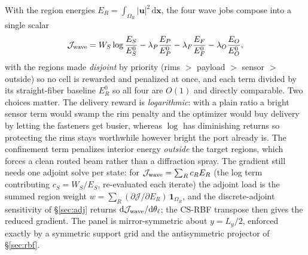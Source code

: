 With the region energies $E_R=\int_{\Omega_R}|\mathbf u|^2\,\mathrm d\mathbf x$, the four
wave jobs compose into a single scalar
\begin{equation}
  \mathcal J_{\rm wave}=W_S\log\frac{E_S}{E_S^0}
  -\lambda_P\frac{E_P}{E_P^0}-\lambda_F\frac{E_F}{E_F^0}-\lambda_O\frac{E_O}{E_O^0},
  \label{eq:panelobj}
\end{equation}
with the regions made \emph{disjoint} by priority (rims $>$ payload $>$ sensor $>$
outside) so no cell is rewarded and penalized at once, and each term divided by its
straight-fiber baseline $E_R^0$ so all four are $O(1)$ and directly comparable. Two
choices matter. The delivery reward is \emph{logarithmic}: with a plain ratio a bright
sensor term would swamp the rim penalty and the optimizer would buy delivery by letting
the fasteners get busier, whereas $\log$ has diminishing returns so protecting the rims
stays worthwhile however bright the port already is. The confinement term penalizes
interior energy \emph{outside} the target regions, which forces a clean routed beam
rather than a diffraction spray. The gradient still needs one adjoint solve per state:
for $\mathcal J_{\rm wave}=\sum_R c_R E_R$ (the log term contributing $c_S=W_S/E_S$,
re-evaluated each iterate) the adjoint load is the summed region weight
$w=\sum_R(\partial\mathcal J/\partial E_R)\,\mathbf 1_{\Omega_R}$, and the
discrete-adjoint sensitivity of \S\ref{sec:adj} returns
$\mathrm d\mathcal J_{\rm wave}/\mathrm d\theta_\ell$; the CS-RBF transpose then gives the
reduced gradient. The panel is mirror-symmetric about $y=L_y/2$, enforced exactly by a
symmetric support grid and the antisymmetric projector of \S\ref{sec:rbf}.

